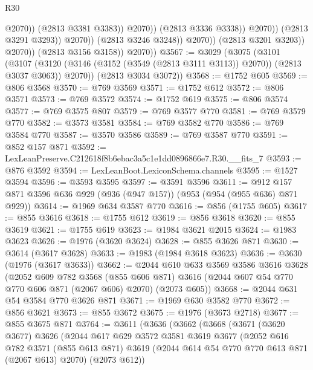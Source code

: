 \begin{lexlean}{R30}
\begin{coremodule}
                                            @2070))
                                        (@2813 @3381 @3383))
                                      @2070))
                                  (@2813 @3336 @3338))
                                @2070))
                            (@2813 @3291 @3293))
                          @2070))
                      (@2813 @3246 @3248))
                    @2070))
                (@2813 @3201 @3203))
              @2070))
          (@2813 @3156 @3158))
        @2070))
@3567 := @3029
    (@3075
      (@3101
        (@3107 (@3120 (@3146 (@3152 (@3549 (@2813 @3111 @3113)) @2070)) (@2813 @3037 @3063)) @2070))
      (@2813 @3034 @3072))
@3568 := @1752 @605
@3569 := @806 @3568
@3570 := @769 @3569
@3571 := @1752 @612
@3572 := @806 @3571
@3573 := @769 @3572
@3574 := @1752 @619
@3575 := @806 @3574
@3577 := @769 @3575 @807
@3579 := @769 @3577 @770
@3581 := @769 @3579 @770
@3582 := @3573 @3581
@3584 := @769 @3582 @770
@3586 := @769 @3584 @770
@3587 := @3570 @3586
@3589 := @769 @3587 @770
@3591 := @852 @157 @871
@3592 := LexLeanPreserve.C212618f8b6ebac3a5c1e1dd0896866e7.R30.__fits_7
@3593 := @876 @3592
@3594 := LexLeanBoot.LexiconSchema.channels
@3595 := @1527 @3594
@3596 := @3593 @3595
@3597 := @3591 @3596
@3611 := @912 @157 @871 @3596 @636 @929 (@936 (@947 @157)) (@953 (@954 (@955 @636) @871 @929))
@3614 := @1969 @634 @3587 @770
@3616 := @856 (@1755 @605)
@3617 := @855 @3616
@3618 := @1755 @612
@3619 := @856 @3618
@3620 := @855 @3619
@3621 := @1755 @619
@3623 := @1984 @3621 @2015
@3624 := @1983 @3623
@3626 := @1976 (@3620 @3624)
@3628 := @855 @3626 @871
@3630 := @3614 (@3617 @3628)
@3633 := @1983 (@1984 @3618 @3623)
@3636 := @3630 (@1976 (@3617 @3633))
@3662 := @2044
    @610
    @633
    @3569
    @3586
    @3616
    @3628
    (@2052
      @609
      @782
      @3568
      (@855 @606 @871)
      @3616
      (@2044 @607 @54 @770 @770 @606 @871 (@2067 @606) @2070)
      (@2073 @605))
@3668 := @2044 @631 @54 @3584 @770 @3626 @871
@3671 := @1969 @630 @3582 @770
@3672 := @856 @3621
@3673 := @855 @3672
@3675 := @1976 (@3673 @2718)
@3677 := @855 @3675 @871
@3764 := @3611
    (@3636
      (@3662
        (@3668
          (@3671
            (@3620 @3677)
            @3626
            (@2044
              @617
              @629
              @3572
              @3581
              @3619
              @3677
              (@2052
                @616
                @782
                @3571
                (@855 @613 @871)
                @3619
                (@2044 @614 @54 @770 @770 @613 @871 (@2067 @613) @2070)
                (@2073 @612))

\end{coremodule}
\end{lexlean}
